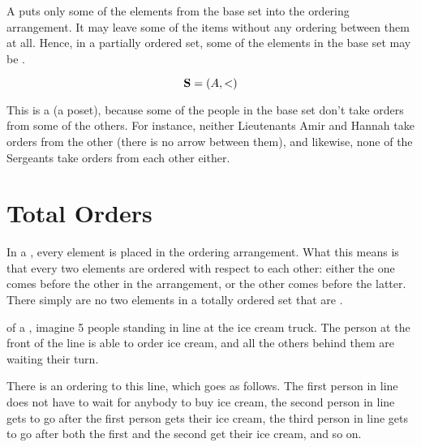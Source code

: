 \documentclass[../../../main.tex]{subfiles}
\begin{document}
\begin{aside}
  \begin{remark}
    A  puts only some of the elements from the base set into the ordering arrangement. It may leave some of the items without any ordering between them at all. Hence, in a partially ordered set, some of the elements in the base set may be .
  \end{remark}
\end{aside}

\begin{equation*}
  \struct{S} = (\set{A}, \strictorder/)
\end{equation*}

This is a  (a poset), because some of the people in the base set don't take orders from some of the others. For instance, neither Lieutenants Amir and Hannah take orders from the other (there is no arrow between them), and likewise, none of the Sergeants take orders from each other either.


\section{Total Orders}

\begin{aside}
  \begin{remark}
    In a , every element is placed in the ordering arrangement. What this means is that every two elements are ordered with respect to each other: either the one comes before the other in the arrangement, or the other comes before the latter. There simply are no two elements in a totally ordered set that are .
  \end{remark}
\end{aside}

 of a , imagine 5 people standing in line at the ice cream truck. The person at the front of the line is able to order ice cream, and all the others behind them are waiting their turn. 

There is an ordering to this line, which goes as follows. The first person in line does not have to wait for anybody to buy ice cream, the second person in line gets to go after the first person gets their ice cream, the third person in line gets to go after both the first and the second get their ice cream, and so on. 
\end{document}
